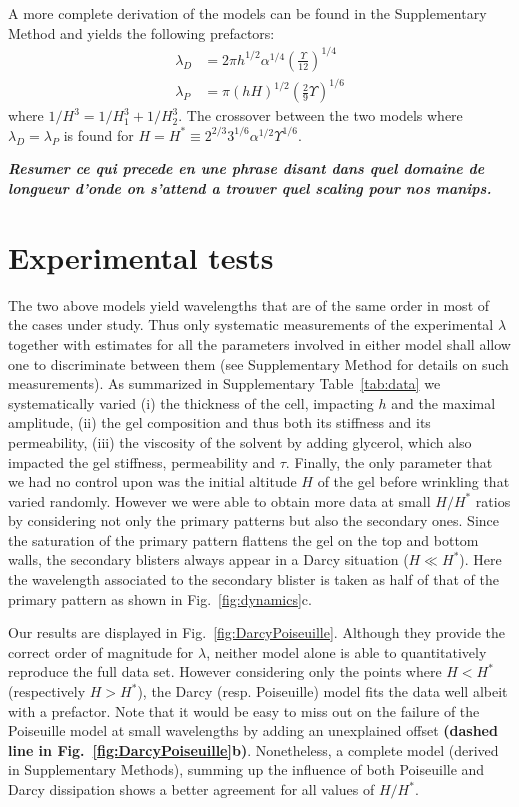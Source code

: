 \documentclass[twocolumn,superscriptaddress,showpacs,preprintnumbers,
amsmath,amssymb,prl]{revtex4-1}
\newcommand{\seb}[1]{\textbf{\color{blue}#1}} %
\begin{document}
A more complete derivation of the models can be found in the Supplementary Method and yields the following prefactors:
\begin{align}
\lambda_D &= 2\pi h^{1/2}\alpha^{1/4}\left(\frac{\Upsilon}{12}\right)^{1/4}\\
\lambda_P &= \pi (hH)^{1/2}\left(\frac{2}{9}\Upsilon\right)^{1/6}
\end{align}
where $1/H^3 = 1/H_1^3 + 1/H_2^3$. The crossover between the two models where $\lambda_D=\lambda_P$ is found for $H = H^* \equiv 2^{2/3} 3^{1/6} \alpha^{1/2} \Upsilon^{1/6}$.

\seb{\it Resumer ce qui precede en une phrase disant dans quel domaine de longueur d'onde on s'attend a trouver quel scaling pour nos manips.}

\section*{Experimental tests}

The two above models yield wavelengths that are of the same order in most of the cases under study. Thus only systematic measurements of the experimental $\lambda$ together with estimates for all the parameters involved in either model shall allow one to discriminate between them (see Supplementary Method for details on such measurements). As summarized in Supplementary Table~\ref{tab:data} we systematically varied (i) the thickness of the cell, impacting $h$ and the maximal amplitude, (ii) the gel composition and thus both its stiffness and its permeability, (iii) the viscosity of the solvent by adding glycerol, which also impacted the gel stiffness, permeability and $\tau$. Finally, the only parameter that we had no control upon was the initial altitude $H$ of the gel before wrinkling that varied randomly. However we were able to obtain more data at small $H/H^*$ ratios by considering not only the primary patterns but also the secondary ones. Since the saturation of the primary pattern flattens the gel on the top and bottom walls, the secondary blisters always appear in a Darcy situation ($H\ll H^*$). Here the wavelength associated to the secondary blister is taken as half of that of the primary pattern as shown in Fig.~\ref{fig:dynamics}c.

Our results are displayed in Fig.~\ref{fig:DarcyPoiseuille}. Although they provide the correct order of magnitude for $\lambda$, neither model alone is able to quantitatively reproduce the full data set. However considering only the points where $H<H^*$ (respectively $H>H^*$), the Darcy (resp. Poiseuille) model fits the data well albeit with a prefactor. Note that it would be easy to miss out on the failure of the Poiseuille model at small wavelengths by adding an unexplained offset \seb{(dashed line in Fig.~\ref{fig:DarcyPoiseuille}b)}. Nonetheless, a complete model (derived in Supplementary Methods), summing up the influence of both Poiseuille and Darcy dissipation shows a better agreement for all values of $H/H^*$.
\end{document}
